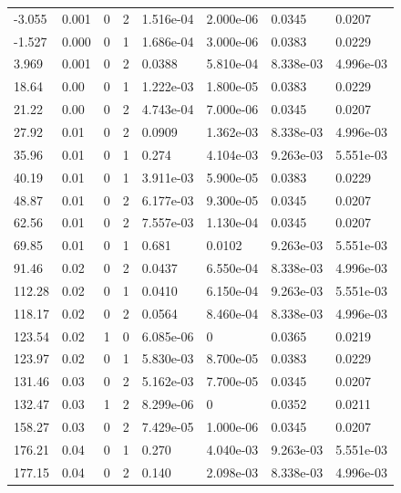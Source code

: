 \documentclass[preview]{standalone}
\begin{document}
{{\begin{tabular}{L{1.2cm}C{1.2cm} C{0.3cm}C{0.5cm} C{1.4cm}C{1.4cm} C{1.4cm}C{1.4cm}}
  -3.055  &  0.001  & 0     &  2 &  1.516e-04  & 2.000e-06  & 0.0345 &  0.0207   \\ 
  -1.527  &  0.000  & 0     &  1 &  1.686e-04  & 3.000e-06  & 0.0383 &  0.0229   \\ 
  3.969  &  0.001  & 0     &  2 &  0.0388  & 5.810e-04  & 8.338e-03 &  4.996e-03   \\ 
  18.64  &  0.00  & 0     &  1 &  1.222e-03  & 1.800e-05  & 0.0383 &  0.0229   \\ 
  21.22  &  0.00  & 0     &  2 &  4.743e-04  & 7.000e-06  & 0.0345 &  0.0207   \\ 
  27.92  &  0.01  & 0     &  2 &  0.0909  & 1.362e-03  & 8.338e-03 &  4.996e-03   \\ 
  35.96  &  0.01  & 0     &  1 &  0.274  & 4.104e-03  & 9.263e-03 &  5.551e-03   \\ 
  40.19  &  0.01  & 0     &  1 &  3.911e-03  & 5.900e-05  & 0.0383 &  0.0229   \\ 
  48.87  &  0.01  & 0     &  2 &  6.177e-03  & 9.300e-05  & 0.0345 &  0.0207   \\ 
  62.56  &  0.01  & 0     &  2 &  7.557e-03  & 1.130e-04  & 0.0345 &  0.0207   \\ 
  69.85  &  0.01  & 0     &  1 &  0.681  & 0.0102  & 9.263e-03 &  5.551e-03   \\ 
  91.46  &  0.02  & 0     &  2 &  0.0437  & 6.550e-04  & 8.338e-03 &  4.996e-03   \\ 
  112.28  &  0.02  & 0     &  1 &  0.0410  & 6.150e-04  & 9.263e-03 &  5.551e-03   \\ 
  118.17  &  0.02  & 0     &  2 &  0.0564  & 8.460e-04  & 8.338e-03 &  4.996e-03   \\ 
  123.54  &  0.02  & 1     &  0 &  6.085e-06  & 0  & 0.0365 &  0.0219   \\ 
  123.97  &  0.02  & 0     &  1 &  5.830e-03  & 8.700e-05  & 0.0383 &  0.0229   \\ 
  131.46  &  0.03  & 0     &  2 &  5.162e-03  & 7.700e-05  & 0.0345 &  0.0207   \\ 
  132.47  &  0.03  & 1     &  2 &  8.299e-06  & 0  & 0.0352 &  0.0211   \\ 
  158.27  &  0.03  & 0     &  2 &  7.429e-05  & 1.000e-06  & 0.0345 &  0.0207   \\ 
  176.21  &  0.04  & 0     &  1 &  0.270  & 4.040e-03  & 9.263e-03 &  5.551e-03   \\ 
  177.15  &  0.04  & 0     &  2 &  0.140  & 2.098e-03  & 8.338e-03 &  4.996e-03   \\ 

\end{tabular}}}
\end{document}
